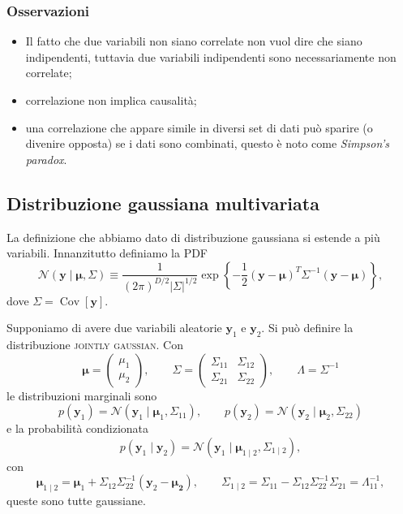 \documentclass[10pt]{article}
\DeclareMathOperator{\Cov}{Cov}
\newcommand{\ve}[1]{\bm{#1}}
\newcommand{\im}[1]{\textsc{#1}}
\newcommand{\cond}{\mid}
\newcommand{\pare}[1]{
	\ensuremath{\left(#1\right)}
}
\newcommand{\spare}[1]{
	\ensuremath{\left[#1\right]}
}
\theoremstyle{definition}
\begin{document}
\subsubsection{Osservazioni}
\begin{itemize}
\item Il fatto che due variabili non siano correlate non vuol dire che siano indipendenti, tuttavia due variabili indipendenti sono necessariamente non correlate;
\item correlazione non implica causalità;
\item una correlazione che appare simile in diversi set di dati può sparire (o divenire opposta) se i dati sono combinati, questo è noto come \textit{Simpson's paradox}.
\end{itemize}

\subsection{Distribuzione gaussiana multivariata}
La definizione che abbiamo dato di distribuzione gaussiana si estende a più variabili. Innanzitutto definiamo la PDF
\begin{equation}
\mathcal{N}\pare{\ve{y}\cond\ve{\mu}, \Sigma} \equiv \frac{1}{\pare{2\pi}^{D/2}\left|\Sigma\right|^{1/2}}\exp\left\{-\frac{1}{2}\pare{\ve{y}-\ve{\mu}}^T\Sigma^{-1}\pare{\ve{y}-\ve{\mu}}\right\},
\end{equation}
dove $\Sigma = \Cov\spare{\ve{y}}$.

Supponiamo di avere due variabili aleatorie $\ve{y}_1$ e $\ve{y}_2$. Si può definire la distribuzione \im{jointly gaussian}. Con
\[
\ve{\mu} = \pare{\begin{array}{c}
\mu_1 \\
\mu_2
\end{array}},\qquad
\Sigma = \pare{\begin{array}{cc}
\Sigma_{11} & \Sigma_{12} \\
\Sigma_{21} & \Sigma_{22}
\end{array}},\qquad
\Lambda = \Sigma^{-1}
\]
le distribuzioni marginali sono
\begin{equation}
p\pare{\ve{y}_1} = \mathcal{N}\pare{\ve{y}_1\cond\ve{\mu}_1, \Sigma_{11}},\qquad p\pare{\ve{y}_2} = \mathcal{N}\pare{\ve{y}_2\cond\ve{\mu}_2, \Sigma_{22}}
\end{equation}
e la probabilità condizionata
\begin{equation}
p\pare{\ve{y}_1\cond\ve{y}_2} = \mathcal{N}\pare{\ve{y}_1\cond\ve{\mu}_{1\cond 2}, \Sigma_{1\cond 2}},
\end{equation}
con
\[
\ve{\mu}_{1\cond 2} = \ve{\mu}_1 + \Sigma_{12}\Sigma_{22}^{-1}\pare{\ve{y}_2 - \ve{\mu_2}},\qquad \Sigma_{1\cond 2} = \Sigma_{11} - \Sigma_{12}\Sigma_{22}^{-1}\Sigma_{21}=\Lambda_{11}^{-1},
\]
queste sono tutte gaussiane.
\end{document}
